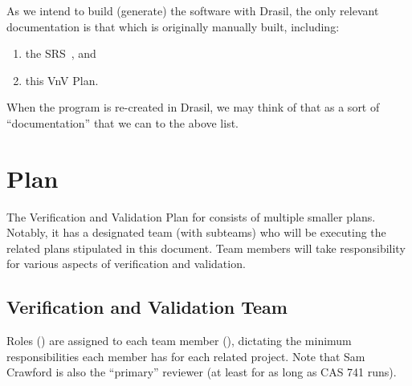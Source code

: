 \documentclass[12pt, titlepage]{article}
\begin{document}
As we intend to build (generate) the software with Drasil, the only relevant
documentation is that which is originally manually built, including:

\begin{enumerate}

    \item the SRS~\cite{BalaciBeamBendingSRS2023}, and

    \item this VnV Plan.

\end{enumerate}

\noindent{}When the \progname{} program is re-created in Drasil, we may think of
that as a sort of ``documentation'' that we can to the above list.

\newpage{}

\section{Plan}

The Verification and Validation Plan for \progname{} consists of multiple
smaller plans. Notably, it has a designated team (with subteams) who will be
executing the related plans stipulated in this document. Team members will take
responsibility for various aspects of verification and validation.

\subsection{Verification and Validation Team}

Roles () are assigned to each team member
(), dictating the minimum responsibilities each member
has for each related project. Note that Sam Crawford is also the ``primary''
reviewer (at least for as long as CAS 741 runs).
\end{document}
